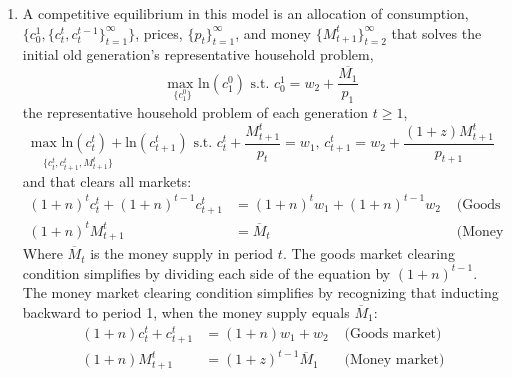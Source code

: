 \documentclass{article}
\newcommand{\loge}[1]{\text{ln}\left(#1\right)}
\newcommand{\usmax}[1]{\underset{\{#1\}}{\text{max }}}
\begin{document}
\begin{enumerate}
	\item A competitive equilibrium in this model is an allocation of consumption, $\{c_0^1,\{c_t^t,c_t^{t-1}\}_{t=1}^\infty\}$, prices, $\{p_t\}_{t=1}^\infty$, and money $\{M_{t+1}^t\}_{t=2}^\infty$ that solves the initial old generation's representative household problem,
		\[
			\usmax{c_1^0}\loge{c_1^0} \text{ s.t. } c_0^1 = w_2 + \frac{\overline{M_1}}{p_1}
		\]
		the representative household problem of each generation $t\geq 1$,
		\[
			\underset{\{c_t^t,c_{t+1}^t, M_{t+1}^t\}}{\text{max }\loge{c_t^t}+}\loge{c_{t+1}^t}\text{ s.t. } 
				c_t^t + \frac{M^t_{t+1}}{p_t} = w_1\text{, }c_{t+1}^t = w_2 + \frac{(1+z)M^t_{t+1}}{p_{t+1}}
		\]
		and that clears all markets:
		\begin{align*}
			(1+n)^tc_t^t + (1+n)^{t-1}c_{t+1}^t  	&= (1+n)^tw_1 + (1+n)^{t-1}w_2 	&\text{ (Goods market)}	\\
			(1+n)^tM_{t+1}^t 						&= \overline{M}_t				&\text{ (Money market)}
		\end{align*}
		Where $\overline{M}_t$ is the money supply in period $t$. The goods market clearing condition simplifies by dividing each side of the equation by $(1+n)^{t-1}$. The money market clearing condition simplifies by recognizing that inducting backward to period 1, when the money supply equals $\overline{M}_1$:
		\begin{align*}
			(1+n)c_t^t + c_{t+1}^t  &= (1+n)w_1 + w_2 				&\text{ (Goods market)}	\\
			(1+n)M_{t+1}^t 			&= (1+z)^{t-1}\overline{M}_1	&\text{ (Money market)}
		\end{align*}
		

\end{enumerate}
\end{document}
